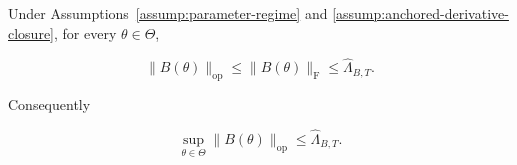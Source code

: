 \begin{lemma}
\label{lem:step-001-height}

Under Assumptions~\ref{assump:parameter-regime} and
\ref{assump:anchored-derivative-closure}, for every \(\theta\in\Theta\),

\begin{equation}
\label{eq:appendix-display-004}
\|B(\theta)\|_{\mathrm{op}}
\leq \|B(\theta)\|_{\mathrm F}
\leq \widehat\Lambda_{B,T}.
\end{equation}

Consequently

\begin{equation}
\label{eq:appendix-display-005}
\sup_{\theta\in\Theta}\|B(\theta)\|_{\mathrm{op}}
\leq\widehat\Lambda_{B,T}.
\end{equation}


\end{lemma}


